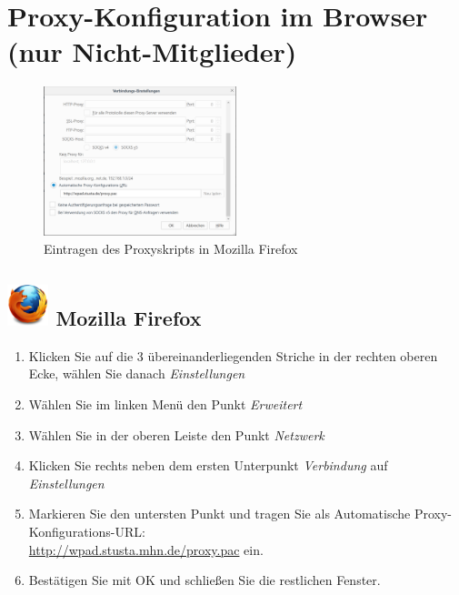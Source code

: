 \documentclass[a4paper,12pt]{scrartcl}
\begin{document}
\newpage

\section*{Proxy-Konfiguration im Browser (nur Nicht-Mitglieder)}
\label{Proxy}

\begin{figure}
	\vspace{-40pt}
	\begin{center}
		\includegraphics[width=0.5\textwidth,keepaspectratio]{Bilder/Proxy_Firefox}
	\end{center}
	\caption{Eintragen des Proxyskripts in Mozilla Firefox}
\end{figure}

\subsection*{\includegraphics[height=1.2cm,keepaspectratio]{Bilder/Firefox_35_logo} Mozilla Firefox}
\begin{enumerate}
	\item Klicken Sie auf die 3 übereinanderliegenden Striche in der rechten oberen Ecke, wählen Sie danach \emph{Einstellungen}
	\item Wählen Sie im linken Menü den Punkt \emph{Erweitert}
	\item Wählen Sie in der oberen Leiste den Punkt \emph{Netzwerk}
	\item Klicken Sie rechts neben dem ersten Unterpunkt \emph{Verbindung} auf \emph{Einstellungen}
	\item Markieren Sie den untersten Punkt und tragen Sie als Automatische Proxy-Konfigurations-URL: \\ \url{http://wpad.stusta.mhn.de/proxy.pac} ein.
	\item Bestätigen Sie mit OK und schließen Sie die restlichen Fenster.\\
	\\
	\\
\end{enumerate}
\end{document}
